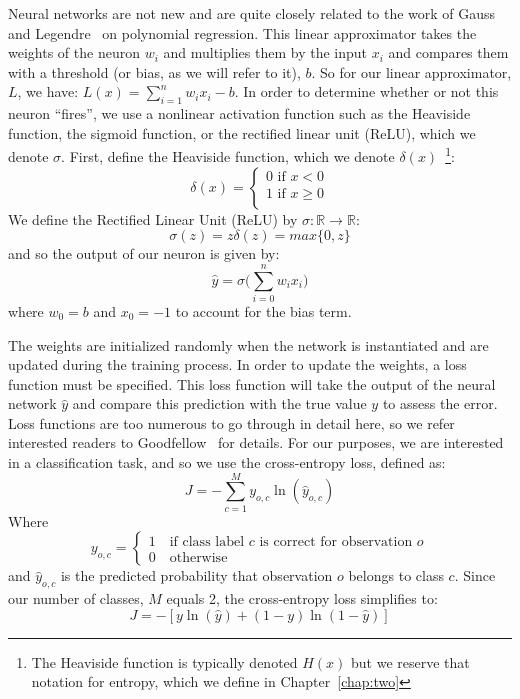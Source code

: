 Neural networks are not new and are quite closely related to the work of Gauss and Legendre~\cite{calin2020deep} on polynomial regression.
This linear approximator takes the weights of the neuron $w_i$ and multiplies them by the input $x_i$ and compares them with a threshold (or bias, as we will refer to it), $b$. 
So for our linear approximator, $L$, we have: $L(x) = \sum_{i=1}^{n}w_i x_i - b$.
In order to determine whether or not this neuron ``fires'', we use a nonlinear activation function such as the Heaviside function, the sigmoid function, or the rectified linear unit (ReLU), which we denote $\sigma$. 
First, define the Heaviside function, which we denote $\delta(x)$~\footnote{The Heaviside function is typically denoted $H(x)$ but we reserve that notation for entropy, which we define in Chapter~\ref{chap:two}}:
\begin{equation}
	\delta(x) = 
	\begin{cases}
		0 \text{ if } x < 0\\
		1 \text{ if } x \geq 0\\
	\end{cases}
\end{equation}
We define the Rectified Linear Unit (ReLU) by $\sigma: \mathbb{R} \to \mathbb{R}$: 
\begin{equation}
	\sigma(z) = z \delta(z) = max\{0, z\}
\end{equation}
and so the output of our neuron is given by:
\begin{equation}\label{eqn: Neural network output}
	\hat{y} = \sigma\bigg(\sum_{i=0}^{n}w_i x_i\bigg)
\end{equation}
where $w_0 = b$ and $x_0 = - 1$ to account for the bias term.

The weights are initialized randomly when the network is instantiated and are updated during the training process.
In order to update the weights, a loss function must be specified.
This loss function will take the output of the neural network $\hat{y}$ and compare this prediction with the true value $y$ to assess the error.
Loss functions are too numerous to go through in detail here, so we refer interested readers to Goodfellow~\cite{goodfellow2016deep} for details.
For our purposes, we are interested in a classification task, and so we use the cross-entropy loss, defined as:
\begin{equation}
	J = -\sum_{c=1}^{M} y_{o,c} \ln(\hat{y}_{o,c})
\end{equation}
Where
$$y_{o,c} =
\begin{cases}
1 \quad\text{if class label $c$ is correct for observation $o$}\\
0 \quad\text{otherwise}	
\end{cases}
$$
and $\hat{y}_{o,c}$ is the predicted probability that observation $o$ belongs to class $c$.
Since our number of classes, $M$ equals 2, the cross-entropy loss simplifies to:
\begin{equation}
	J = -[y \ln(\hat{y}) + (1 - y) \ln(1 - \hat{y})]
\end{equation}

